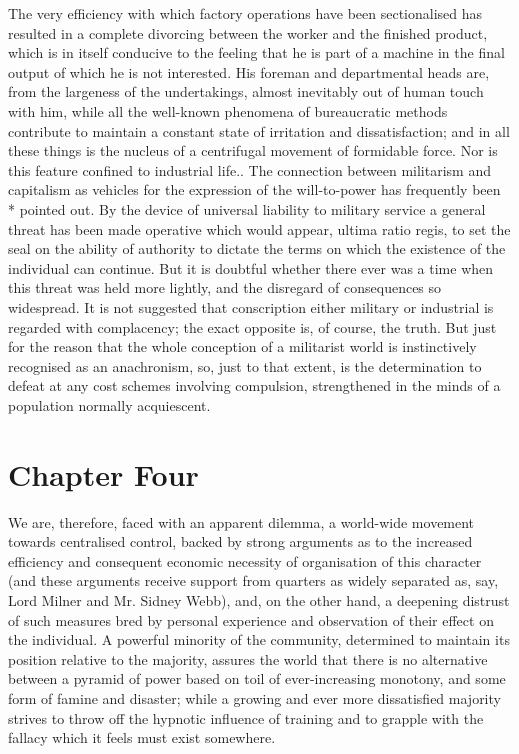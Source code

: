 \documentclass{book}
\begin{document}
The very efficiency with which factory operations have been sectionalised has resulted in a complete divorcing between the worker and the finished product, which is in itself conducive to the feeling that he is part of a machine in the final output of which he is not interested. His foreman and departmental heads are, from the largeness of the undertakings, almost inevitably out of human touch with him, while all the well-known phenomena of bureaucratic methods contribute to maintain a constant state of irritation and dissatisfaction; and in all these things is the nucleus of a centrifugal movement of formidable force. Nor is this feature confined to industrial life.. The connection between militarism and capitalism as vehicles for the expression of the will-to-power has frequently been * pointed out. By the device of universal liability to military service a general threat has been made operative which would appear, ultima ratio regis, to set the seal on the ability of authority to dictate the terms on which the existence of the individual can continue. But it is doubtful whether there ever was a time when this threat was held more lightly, and the disregard of consequences so widespread. It is not suggested that conscription either military or industrial is regarded with complacency; the exact opposite is, of course, the truth. But just for the reason that the whole conception of a militarist world is instinctively recognised as an anachronism, so, just to that extent, is the determination to defeat at any cost schemes involving compulsion, strengthened in the minds of a population normally acquiescent.

\chapter{Chapter Four}
\label{chapter-4}
We are, therefore, faced with an apparent dilemma, a world-wide movement towards centralised control, backed by strong arguments as to the increased efficiency and consequent economic necessity of organisation of this character (and these arguments receive support from quarters as widely separated as, say, Lord Milner and Mr. Sidney Webb), and, on the other hand, a deepening distrust of such measures bred by personal experience and observation of their effect on the individual. A powerful minority of the community, determined to maintain its position relative to the majority, assures the world that there is no alternative between a pyramid of power based on toil of ever-increasing monotony, and some form of famine and disaster; while a growing and ever more dissatisfied majority strives to throw off the hypnotic influence of training and to grapple with the fallacy which it feels must exist somewhere.
\end{document}
